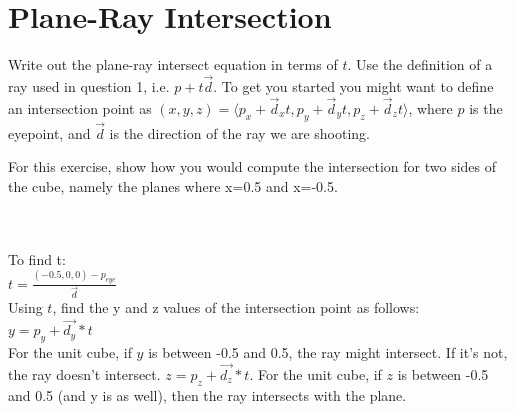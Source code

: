 \documentclass[10pt,twocolumn]{article}
\begin{document}
\section{Plane-Ray Intersection}

Write out the plane-ray intersect equation in terms of $t$. Use the definition of a ray used in question 1, i.e. $p + t\vec{d}$. To get you started you might want to define
an intersection point as $(x, y, z) = \langle p_x + \vec{d}_xt, p_y + \vec{d}_yt, p_z + \vec{d}_zt\rangle$, where $p$ is the eyepoint, and $\vec{d}$ is the direction of the ray we are shooting. 

For this exercise, show how you would compute the intersection for two sides of the cube, namely the planes where x=0.5 and x=-0.5.

\begin{framed}
 \\\\
To find t: \\
$t = \frac{(-0.5, 0, 0) - p_{eye}}{\vec{d}}$ \\
Using $t$, find the y and z values of the intersection point as follows: \\
$y = p_y + \vec{d_y} *t$\\
For the unit cube, if $y$ is between -0.5 and 0.5, the ray might intersect. If it's not, the ray doesn't intersect.
$z = p_z + \vec{d_z} *t$.
For the unit cube, if $z$ is between -0.5 and 0.5 (and y is as well), then the ray intersects with the plane.
\end{framed}
\end{document}
